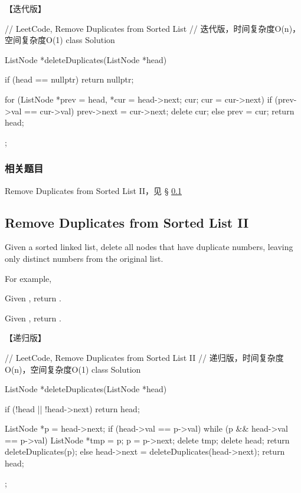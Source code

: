 【迭代版】
\begin{Code}
	// LeetCode, Remove Duplicates from Sorted List
	// 迭代版，时间复杂度O(n)，空间复杂度O(1)
	class Solution {
		ListNode *deleteDuplicates(ListNode *head) {
			if (head == nullptr) return nullptr;
			
			for (ListNode *prev = head, *cur = head->next; cur; cur =
				cur->next) {
				if (prev->val == cur->val) {
					prev->next = cur->next;
					delete cur;
				} else {
					prev = cur;
				}
			}
			return head;
		}
	};
\end{Code}


\subsubsection{相关题目}

\begindot
\item Remove Duplicates from Sorted List II，见 \S
\ref{sec:remove-duplicates-from-sorted-list-ii}
\myenddot


\subsection{Remove Duplicates from Sorted List II}
\label{sec:remove-duplicates-from-sorted-list-ii}



Given a sorted linked list, delete all nodes that have duplicate numbers,
leaving only distinct numbers from the original list.

For example,

Given , return .

Given , return .


【递归版】
\begin{Code}
	// LeetCode, Remove Duplicates from Sorted List II
	// 递归版，时间复杂度O(n)，空间复杂度O(1)
	class Solution {
		ListNode *deleteDuplicates(ListNode *head) {
			if (!head || !head->next) return head;
			
			ListNode *p = head->next;
			if (head->val == p->val) {
				while (p && head->val == p->val) {
					ListNode *tmp = p;
					p = p->next;
					delete tmp;
				}
				delete head;
				return deleteDuplicates(p);
			} else {
			head->next = deleteDuplicates(head->next);
			return head;
		}
	}
};
\end{Code}

